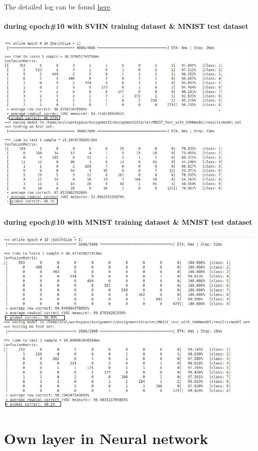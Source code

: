 \documentclass{article}
\begin{document}
	The detailed log can be found
	\href{./MNIST_test_with_SVHNmodel/results/SVHN_MNIST_trace.log}{here}.\\\\
	\newpage
	\textbf{during epoch\#10 with SVHN training dataset \& MNIST test dataset}\\\\
	\includegraphics[scale=0.4]{./MNIST_test_with_SVHNmodel/results/svhn+mnist.jpg}\\\\
	\textbf{during epoch\#10 with MNIST training dataset \& MNIST test dataset}\\\\
	\includegraphics[scale=0.4]{./MNIST_test_with_SVHNmodel/results/mnist+mnist.jpg}
	\newpage
	\section{Own layer in Neural network}
	
\end{document}
